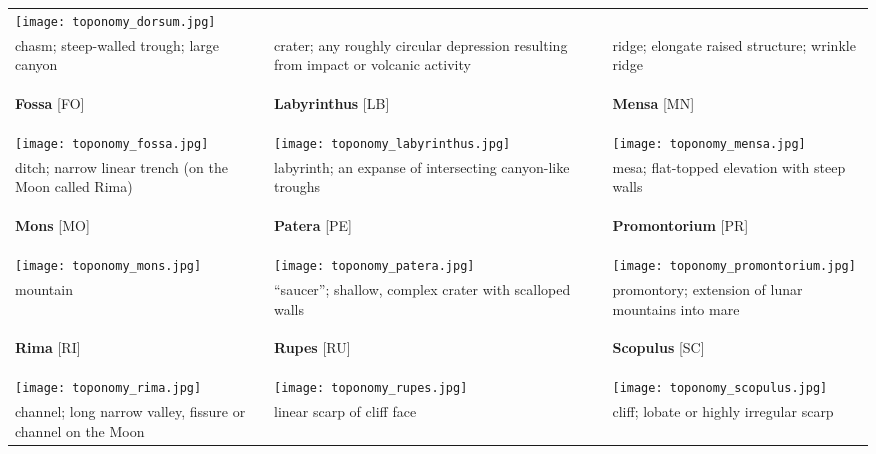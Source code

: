 \begin{longtable}{p{45mm}|p{45mm}|p{45mm}}
\texttt{[image: toponomy\_dorsum.jpg]} \\
chasm; steep-walled trough; large canyon & crater; any roughly circular depression resulting from impact or volcanic activity & ridge; elongate raised structure; wrinkle ridge \\\midrule
\begin{center}\textbf{Fossa} [FO]\end{center} & \begin{center}\textbf{Labyrinthus} [LB]\end{center} & \begin{center}\textbf{Mensa} [MN]\end{center} \\
\texttt{[image: toponomy\_fossa.jpg]} & 
\texttt{[image: toponomy\_labyrinthus.jpg]} & 
\texttt{[image: toponomy\_mensa.jpg]} \\
ditch; narrow linear trench (on the Moon called Rima) & labyrinth; an expanse of intersecting  canyon-like troughs & mesa; flat-topped elevation with steep walls \\\midrule
\begin{center}\textbf{Mons} [MO]\end{center} & \begin{center}\textbf{Patera} [PE]\end{center} & \begin{center}\textbf{Promontorium} [PR]\end{center} \\
\texttt{[image: toponomy\_mons.jpg]} & 
\texttt{[image: toponomy\_patera.jpg]} & 
\texttt{[image: toponomy\_promontorium.jpg]} \\
mountain & ``saucer''; shallow, complex crater with scalloped walls & promontory; extension of lunar mountains into mare \\\midrule
\begin{center}\textbf{Rima} [RI]\end{center} & \begin{center}\textbf{Rupes} [RU]\end{center} & \begin{center}\textbf{Scopulus} [SC]\end{center} \\ 
\texttt{[image: toponomy\_rima.jpg]} & 
\texttt{[image: toponomy\_rupes.jpg]} & 
\texttt{[image: toponomy\_scopulus.jpg]} \\
channel; long narrow valley, fissure or channel on the Moon & linear scarp of cliff face & cliff; lobate or highly irregular scarp \\\midrule

\end{longtable}
